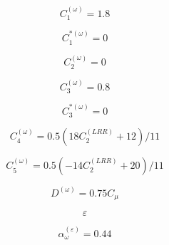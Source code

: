 {\newpage\clearpage
{}%
\begin{displaymath}
C_1^{(\omega)} = 1.8
\end{displaymath}%
\lthtmldisplayZ
\lthtmlcheckvsize\clearpage}

{\newpage\clearpage
{}%
\begin{displaymath}
C_1^{*(\omega)} = 0
\end{displaymath}%
\lthtmldisplayZ
\lthtmlcheckvsize\clearpage}

{\newpage\clearpage
{}%
\begin{displaymath}
C_2^{(\omega)} = 0
\end{displaymath}%
\lthtmldisplayZ
\lthtmlcheckvsize\clearpage}

{\newpage\clearpage
{}%
\begin{displaymath}
C_3^{(\omega)} = 0.8
\end{displaymath}%
\lthtmldisplayZ
\lthtmlcheckvsize\clearpage}

{\newpage\clearpage
{}%
\begin{displaymath}
C_3^{*(\omega)} = 0
\end{displaymath}%
\lthtmldisplayZ
\lthtmlcheckvsize\clearpage}

{\newpage\clearpage
{}%
\begin{displaymath}
C_4^{(\omega)} = 0.5 (18 C_2^{(LRR)} + 12) / 11
\end{displaymath}%
\lthtmldisplayZ
\lthtmlcheckvsize\clearpage}

{\newpage\clearpage
{}%
\begin{displaymath}
C_5^{(\omega)} = 0.5 (-14 C_2^{(LRR)} + 20)/11
\end{displaymath}%
\lthtmldisplayZ
\lthtmlcheckvsize\clearpage}

{\newpage\clearpage
{}%
\begin{displaymath}
D^{(\omega)} = 0.75 C_{\mu}
\end{displaymath}%
\lthtmldisplayZ
\lthtmlcheckvsize\clearpage}

{\newpage\clearpage
{}%
\begin{displaymath}
\varepsilon
\end{displaymath}%
\lthtmldisplayZ
\lthtmlcheckvsize\clearpage}

{\newpage\clearpage
{}%
\begin{displaymath}
\alpha_{\omega}^{(\varepsilon)} = 0.44
\end{displaymath}%
\lthtmldisplayZ
\lthtmlcheckvsize\clearpage}

